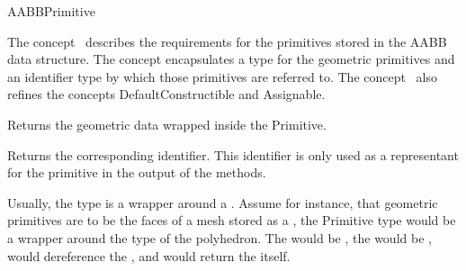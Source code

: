 \ccRefPageBegin


\begin{ccRefConcept}{AABBPrimitive}


\ccDefinition
  
The concept \ccRefName\ describes the requirements for the primitives stored in the AABB data structure. The concept encapsulates a type for the geometric primitives and an identifier type by which those primitives are referred to. The concept \ccRefName\ also refines the concepts DefaultConstructible and Assignable.

\ccTypes




\ccOperations

{Returns the geometric data wrapped inside the Primitive.}

{Returns the corresponding identifier. This identifier is only used as a representant for the primitive in the output of the  methods.}




\ccSeeAlso
{}

\ccExample

Usually, the  type is a wrapper around a . Assume for instance, that geometric primitives 
are to be the faces of a mesh stored as a , the Primitive type would be a wrapper around the   type of the polyhedron. The  would be ,
 the  would be ,  would dereference the , and  would return the  itself. 


\end{ccRefConcept}
